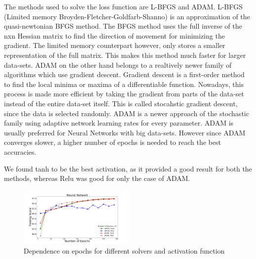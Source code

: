 The methods used to solve the loss function are L-BFGS and ADAM. L-BFGS (Limited memory Broyden-Fletcher-Goldfarb-Shanno) is an approximation of the quasi-newtonian BFGS method. The BFGS method uses the full inverse of the nxn Hessian matrix to find the direction of movement for minimizing the gradient. The limited memory counterpart however, only stores a smaller representation of the full matrix. This makes this method much faster for larger data-sets.
ADAM on the other hand belongs to a realtively newer family of algorithms which use gradient descent. Gradient descent is a first-order method to find the local minima or maxima of a differentiable function. Nowadays, this process is made more efficient by taking the gradient from parts of the data-set instead of the entire data-set itself. This is called stocahstic gradient descent, since the data is selected randomly. ADAM is a newer approach of the stochastic family using adaptive network learning rates for every parameter. ADAM is usually preferred for Neural Networks with big data-sets. However since ADAM converges slower, a higher number of epochs is needed to reach the best accuracies.\\ 

We found tanh to be the best activation, as it provided a good result for both the methods, whereas Relu was good for only the case of ADAM.\\
\begin{figure}[h]
\hspace*{-0.5cm}
\includegraphics[width=0.5\textwidth]{plots/nn_epochs.pdf}
\caption{
Dependence on epochs for different solvers and activation function
}
\label{fig:NN_epochs}
\end{figure}

